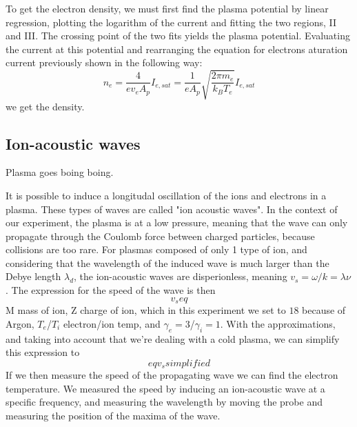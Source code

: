 To get the electron density, we must first find the plasma potential by linear regression, plotting the logarithm of the current and fitting the two regions, II and III.
The crossing point of the two fits yields the plasma potential.
Evaluating the current at this potential and rearranging the equation for electrons aturation current previously shown in the following way:
\begin{equation}
    n_e = \frac{4}{e v_e A_p} I_{e,sat} = \frac{1}{e A_p} \sqrt{\frac{2 \pi m_e}{k_B T_e}} I_{e,sat}
\end{equation}
we get the density.

\subsection{Ion-acoustic waves}
Plasma goes boing boing.

It is possible to induce a longitudal oscillation of the ions and electrons in a plasma. These types of waves are called "ion acoustic waves". In the context of our experiment, the plasma is at a low pressure, meaning that the wave can only propagate through the Coulomb force between charged particles, because collisions are too rare.
For plasmas composed of only 1 type of ion, and considering that the wavelength of the induced wave is much larger than the Debye length $\lambda_d$, the ion-acoustic waves are disperionless, meaning $v_s = \omega/k = \lambda \nu$. The expression for the speed of the wave is then
\begin{equation}
    v_s eq
\end{equation}
M mass of ion, Z charge of ion, which in this experiment we set to $18$ because of Argon, $T_e$/$T_i$ electron/ion temp, and $\gamma_e=3$/$\gamma_i=1$. With the approximations, and taking into account that we're dealing with a cold plasma, we can simplify this expression to
\begin{equation}
    eq v_s simplified
\end{equation}
If we then measure the speed of the propagating wave we can find the electron temperature. We measured the speed by inducing an ion-acoustic wave at a specific frequency, and measuring the wavelength by moving the probe and measuring the position of the maxima of the wave.


